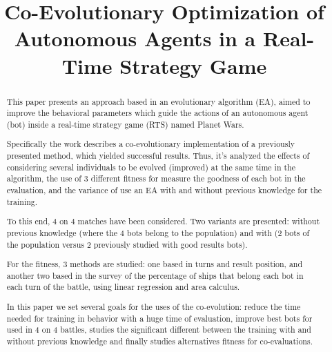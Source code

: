 \documentclass{llncs}
\begin{document}

\title{Co-Evolutionary Optimization of Autonomous Agents in a Real-Time Strategy Game}





%

\maketitle

%
%
\begin{abstract}
This paper presents an approach based in an evolutionary algorithm
(EA), aimed to improve the behavioral parameters which guide the
actions of an autonomous agent (bot) inside a real-time strategy game
(RTS) named Planet Wars. 

Specifically the work describes a co-evolutionary implementation of a
previously presented method, which yielded successful results.
Thus, it's analyzed the effects of considering several individuals
to be evolved (improved) at the same time in the algorithm,
the use of 3 different fitness for measure the goodness of each bot in the evaluation,
and the variance of use an EA with and without previous knowledge for the training.

To this end, 4 on 4 matches have been considered. Two variants are presented:
without previous knowledge (where the 4 bots belong to the population) and with
(2 bots of the population versus 2 previously studied with good results bots).

For the fitness, 3 methods are studied: one based in turns and result position,
and another two based in the survey of the percentage of ships that belong each bot in each turn of the battle, using linear regression and area calculus. 

In this paper we set several goals for the uses of the co-evolution:
reduce the time needed for training in behavior with a huge time of evaluation,
improve best bots for used in 4 on 4 battles,
studies the significant different between the training with and without previous knowledge
and finally studies alternatives fitness for co-evaluations.

\end{abstract}
\end{document}
